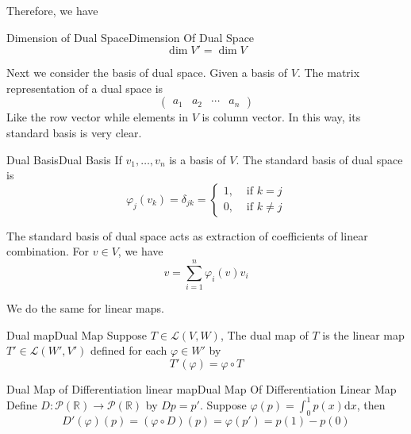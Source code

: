 \documentclass[../main.tex]{subfiles}
\begin{document}
Therefore, we have
\begin{theorem}{Dimension of Dual Space}{Dimension Of Dual Space}
\begin{equation}
\dim V' = \dim V
\end{equation}
\end{theorem}

Next we consider the basis of dual space. Given a basis of $V$. The matrix representation of a dual space is
\begin{equation*}
\begin{pmatrix}
	a_1&a_2&\cdots &a_n
\end{pmatrix}
\end{equation*}
Like the row vector while elements in $V$ is column vector. In this way, its standard basis is very clear.

\begin{definition}{Dual Basis}{Dual Basis}
If $v_1, \ldots ,v_n$ is a basis of $V$. The standard basis of dual space is
\begin{equation}
\varphi_j(v_k) = \delta_{jk} = 
\begin{cases}
	1, &\text{ if } k=j\\
	0, & \text{ if }k\neq j
\end{cases}
\end{equation}
\end{definition}

\begin{remark}
The standard basis of dual space acts as extraction of coefficients of linear combination. For $v\in V$, we have
\begin{equation*}
v = \sum_{i=1}^{n} \varphi_i(v)v_i
\end{equation*}
\end{remark}

We do the same for linear maps.
\begin{definition}{Dual map}{Dual Map}
Suppose $T\in \mathscr{L}(V,W)$, The dual map of $T$ is the linear map $T'\in \mathscr{L}(W',V')$ defined for each $\varphi \in W'$ by
\begin{equation}
T'(\varphi) = \varphi \circ T
\end{equation}
\end{definition}

\begin{example}{Dual Map of Differentiation linear map}{Dual Map Of Differentiation Linear Map}
Define $D: \mathscr{P}(\mathbb{R}) \rightarrow  \mathscr{P}(\mathbb{R})$ by $Dp=p'$. Suppose $\varphi (p) = \int_0^1 p(x) \mathrm{d}x$, then
\begin{equation*}
D'(\varphi)(p) = (\varphi \circ D)(p)=\varphi(p') = p(1)-p(0)
\end{equation*}
\end{example}
\end{document}
